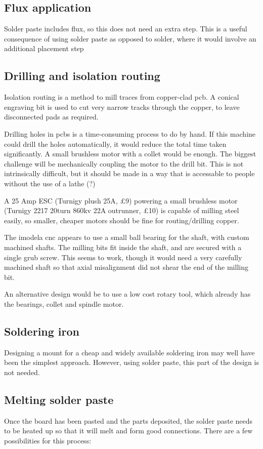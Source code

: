 \documentclass[a4paper,11pt]{article}  %
\begin{document}
\subsection{Flux application}
Solder paste includes flux, so this does not need an extra step. This is a useful consequence of using solder paste as opposed to solder,
where it would involve an additional placement step

\subsection{Drilling and isolation routing}
Isolation routing is a method to mill traces from copper-clad pcb. A conical engraving bit is used to cut very narrow tracks through
the copper, to leave disconnected pads as required. 

Drilling holes in pcbs is a time-consuming process to do by hand. If this machine could drill the holes automatically,
it would reduce the total time taken significantly. A small brushless motor with a collet would be enough. The biggest challenge
will be mechanically coupling the motor to the drill bit. This is not intrinsically difficult, but it should be made in a way that
is accessable to people without the use of a lathe (?)

A 25 Amp ESC (Turnigy plush 25A, £9) powering a small brushless motor (Turnigy 2217 20turn 860kv 22A outrunner, £10) is capable of milling
steel easily, so smaller, cheaper motors should be fine for routing/drilling copper.

The imodela cnc appears to use a small ball bearing for the shaft, with custom machined shafts. The milling bits fit inside the shaft, and
are secured with a single grub screw. This seems to work, though it would need a very carefully machined shaft so that axial misalignment
did not shear the end of the milling bit.

An alternative design would be to use a low cost rotary tool, which already has the bearings, collet and spindle motor. 

\subsection{Soldering iron}
Designing a mount for a cheap and widely available soldering iron may well have been the simplest approach. However, using solder paste, 
this part of the design is not needed.

\subsection{Melting solder paste}
Once the board has been pasted and the parts deposited, the solder paste needs to be heated up so that it will melt and form good connections.
There are a few possibilities for this process:
\end{document}
